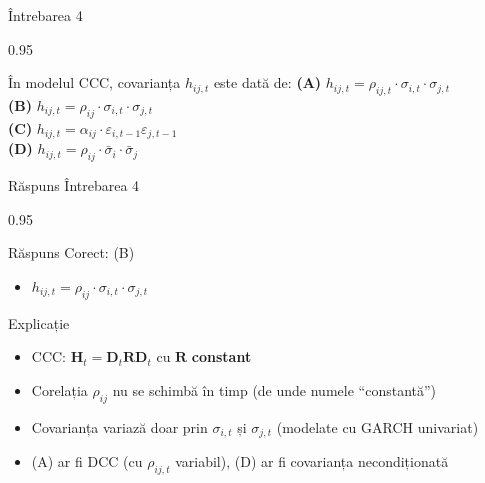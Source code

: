 \documentclass[9pt, aspectratio=169, t]{beamer}
\begin{document}
\begin{frame}{Întrebarea 4}
    \begin{cminipage}{0.95\textwidth}
    \begin{block}{În modelul CCC, covarianța $h_{ij,t}$ este dată de:}
        \textcolor{MainBlue}{\textbf{(A)}} $h_{ij,t} = \rho_{ij,t} \cdot \sigma_{i,t} \cdot \sigma_{j,t}$\\[3pt]
        \textcolor{MainBlue}{\textbf{(B)}} $h_{ij,t} = \rho_{ij} \cdot \sigma_{i,t} \cdot \sigma_{j,t}$\\[3pt]
        \textcolor{MainBlue}{\textbf{(C)}} $h_{ij,t} = \alpha_{ij} \cdot \varepsilon_{i,t-1} \varepsilon_{j,t-1}$\\[3pt]
        \textcolor{MainBlue}{\textbf{(D)}} $h_{ij,t} = \rho_{ij} \cdot \bar{\sigma}_i \cdot \bar{\sigma}_j$
    \end{block}
    \end{cminipage}
\end{frame}

\begin{frame}{Răspuns Întrebarea 4}
    \begin{cminipage}{0.95\textwidth}
    \begin{exampleblock}{Răspuns Corect: (B)}
        \begin{itemize}\setlength{\itemsep}{0pt}
            \item $h_{ij,t} = \rho_{ij} \cdot \sigma_{i,t} \cdot \sigma_{j,t}$
        \end{itemize}
    \end{exampleblock}

    \pause
    \begin{block}{Explicație}
        \begin{itemize}\setlength{\itemsep}{0pt}
            \item CCC: $\mathbf{H}_t = \mathbf{D}_t \mathbf{R} \mathbf{D}_t$ cu $\mathbf{R}$ \textbf{constant}
            \item Corelația $\rho_{ij}$ nu se schimbă în timp (de unde numele ``constantă'')
            \item Covarianța variază doar prin $\sigma_{i,t}$ și $\sigma_{j,t}$ (modelate cu GARCH univariat)
            \item (A) ar fi DCC (cu $\rho_{ij,t}$ variabil), (D) ar fi covarianța necondiționată
        \end{itemize}
    \end{block}
    \end{cminipage}
\end{frame}
\end{document}
